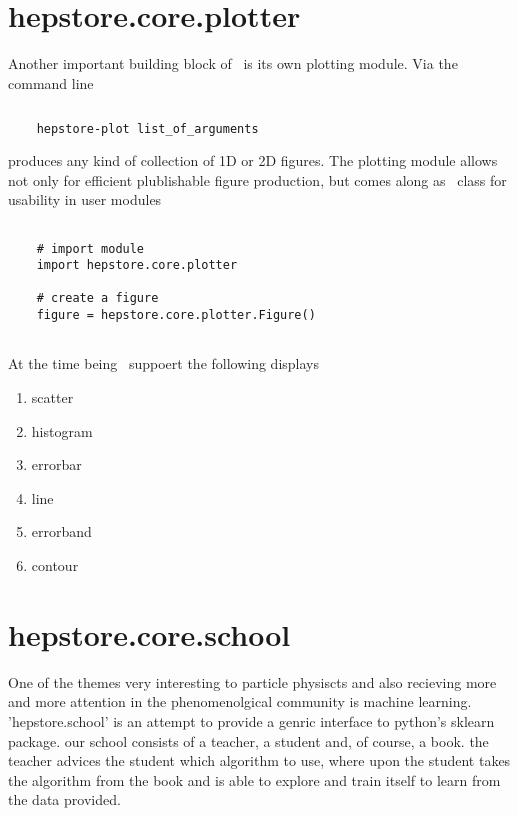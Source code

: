 \section{hepstore.core.plotter}

Another important building block of \hepstore~is its own plotting
module. Via the command line
%
\begin{changemargin}{1.5cm}{1.5cm}
  \centering
  \begin{lstlisting}[language=Bash]
    
    hepstore-plot list_of_arguments
  \end{lstlisting}
\end{changemargin}
%
produces any kind of collection of 1D or 2D figures. The plotting
module allows not only for efficient plublishable figure production,
but comes along as \python~class for usability in user modules
%
\begin{changemargin}{1.5cm}{1.5cm}
  \centering
  \begin{lstlisting}
    
    # import module
    import hepstore.core.plotter

    # create a figure
    figure = hepstore.core.plotter.Figure()
    
  \end{lstlisting}
\end{changemargin}
%
At the time being \hepstore~suppoert the following displays
%
\begin{enumerate}
\item scatter
\item histogram
\item errorbar
\item line
\item errorband
\item contour
\end{enumerate}
%


\section{hepstore.core.school}
One of the themes very interesting to particle physiscts and also
recieving more and more attention in the phenomenolgical community is
machine learning. 'hepstore.school' is an attempt to provide a genric
interface to python's sklearn package. our school consists of a
teacher, a student and, of course, a book. the teacher advices the
student which algorithm to use, where upon the student takes the
algorithm from the book and is able to explore and train itself to
learn from the data provided.


